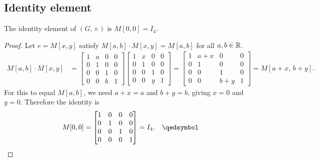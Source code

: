 \subsection{Identity element}

\begin{proposition}
The identity element of $(G, \times)$ is $M[0, 0] = I_4$.
\end{proposition}


\begin{proof}
Let $e = M[x, y]$ satisfy $M[a,b] \cdot M[x,y] = M[a,b]$ for all $a,b \in \mathbb{R}$.
\begin{align*}
    M[a,b] \cdot M[x,y]
    &=
    \begin{bmatrix}
        1 & a & 0 & 0 \\
        0 & 1 & 0 & 0 \\
        0 & 0 & 1 & 0 \\
        0 & 0 & b & 1
    \end{bmatrix}
    \begin{bmatrix}
        1 & x & 0 & 0 \\
        0 & 1 & 0 & 0 \\
        0 & 0 & 1 & 0 \\
        0 & 0 & y & 1
    \end{bmatrix}
    =
    \begin{bmatrix}
        1 & a+x & 0 & 0 \\
        0 & 1   & 0 & 0 \\
        0 & 0   & 1 & 0 \\
        0 & 0 & b+y & 1
    \end{bmatrix}
    = M[a+x,\, b+y].
\end{align*}
For this to equal $M[a,b]$, we need $a + x = a$ and $b + y = b$, giving $x = 0$
and $y = 0$. Therefore the identity is
\[
    M[0,0]
    =
    \begin{bmatrix}
        1&0&0&0\\0&1&0&0\\0&0&1&0\\0&0&0&1
    \end{bmatrix}
    = I_4. \qedhere
\]
\end{proof}

